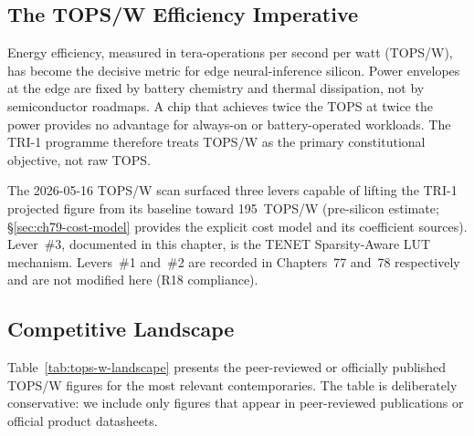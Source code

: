 \subsection{The TOPS/W Efficiency Imperative}
\label{subsec:ch79-efficiency-imperative}

Energy efficiency, measured in tera-operations per second per watt (TOPS/W),
has become the decisive metric for edge neural-inference silicon.
Power envelopes at the edge are fixed by battery chemistry and thermal
dissipation, not by semiconductor roadmaps.
A chip that achieves twice the TOPS at twice the power provides no advantage
for always-on or battery-operated workloads.
The TRI-1 programme therefore treats TOPS/W as the primary constitutional
objective, not raw TOPS.

The 2026-05-16 TOPS/W scan surfaced three levers capable of lifting
the TRI-1 projected figure from its baseline toward 195~TOPS/W
(pre-silicon estimate; §\ref{sec:ch79-cost-model} provides the explicit
cost model and its coefficient sources).
Lever~\#3, documented in this chapter, is the TENET Sparsity-Aware LUT
mechanism.  Levers~\#1 and~\#2 are recorded in Chapters~77 and~78
respectively and are not modified here (R18 compliance).

\subsection{Competitive Landscape}
\label{subsec:ch79-competitive-landscape}

Table~\ref{tab:tops-w-landscape} presents the peer-reviewed or officially
published TOPS/W figures for the most relevant contemporaries.
The table is deliberately conservative: we include only figures that
appear in peer-reviewed publications or official product datasheets.

